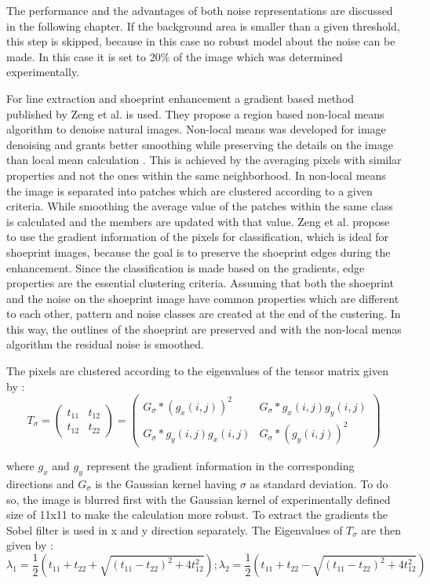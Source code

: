 \documentclass[draft,final]{vutinfth} %
\begin{document}
The performance and the advantages of both noise representations are discussed in the following chapter.
If the background area is smaller than a given threshold, this step is skipped, because in this case no robust model about the noise can be made.
In this case it is set to 20\% of the image which was determined experimentally.
\par
For line extraction and shoeprint enhancement a gradient based method published by Zeng et al. \cite{zeng2011region} is used.
They propose a region based non-local means algorithm to denoise natural images.
Non-local means was developed for image denoising and grants better smoothing while preserving the details on the image than local mean calculation \cite{buades2005non}.
This is achieved by the averaging pixels with similar properties and not the ones within the same neighborhood.
In non-local means the image is separated into patches which are clustered according to a given criteria.
While smoothing the average value of the patches within the same class is calculated and the members are updated with that value.
Zeng et al. \cite{zeng2011region} propose to use the gradient information of the pixels for classification, which is ideal for shoeprint images, because the goal is to preserve the shoeprint edges during the enhancement.
Since the classification is made based on the gradients, edge properties are the essential clustering criteria.
Assuming that both the shoeprint and the noise on the shoeprint image have common properties which are different to each other, pattern and noise classes are created at the end of the custering.
In this way, the outlines of the shoeprint are preserved and with the non-local menas algorithm the residual noise is smoothed.
\par 
The pixels are clustered according to the eigenvalues of the tensor matrix given by \cite{zeng2011region}:
\begin{equation}
T_\sigma = 
\begin{pmatrix}
t_{11} & t_{12} \\
t_{12} & t_{22}
\end{pmatrix}
=
\begin{pmatrix}
G_\sigma*(g_x(i,j))^2 & G_{\sigma}*g_x(i, j)g_y(i, j)\\
G_{\sigma}*g_y(i, j)g_x(i, j) & G_{\sigma}*(g_y(i, j))^2
\end{pmatrix}
\end{equation}

where $g_x$ and $g_y$ represent the gradient information in the corresponding directions and $G_\sigma$ is the Gaussian kernel having $\sigma$ as standard deviation.
To do so, the image is blurred first with the Gaussian kernel of experimentally defined size of 11x11 to make the calculation more robust.
To extract the gradients the Sobel filter is used in x and y direction separately.
The Eigenvalues of $T_\sigma$ are then given by \cite{zeng2011region}:
\begin{equation}
\lambda_1 = \frac{1}{2}(t_{11} + t_{22} + \sqrt{(t_{11}-t_{22})^2 + 4t_{12}^2});
\lambda_2 = \frac{1}{2}(t_{11} + t_{22} - \sqrt{(t_{11}-t_{22})^2 + 4t_{12}^2})
\label{eig}
\end{equation}
\end{document}
